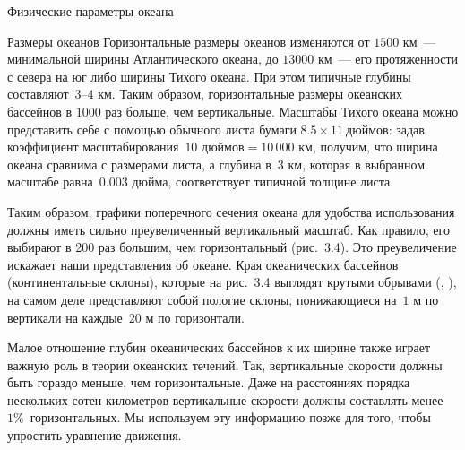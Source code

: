 \begin{chapter}{Физические параметры океана}
\begin{section}{Размеры океанов}
Горизонтальные размеры океанов изменяются от $1500\mbox{~км}$~--- минимальной
ширины Атлантического океана, до $13000\mbox{~км}$~--- его протяженности
с севера на юг либо ширины Тихого океана.
При этом типичные глубины составляют~$3$--$4\mbox{~км}$.
Таким образом, горизонтальные размеры океанских бассейнов в $1000\mbox{~раз}$
больше, чем вертикальные.  Масштабы Тихого океана можно представить
себе с помощью обычного листа бумаги $8.5 \times 11~\mbox{дюймов}$:
задав коэффициент масштабирования~$10\mbox{~дюймов} = 10\,000\mbox{~км}$,
получим, что ширина океана сравнима с размерами листа, а глубина 
в~$3\mbox{~км}$, которая в выбранном масштабе равна~$0.003\mbox{~дюйма}$,
соответствует типичной толщине листа.
%


Таким образом, графики поперечного сечения океана для
удобства использования должны иметь сильно преувеличенный вертикальный
масштаб. Как правило, его выбирают в 200 раз большим, 
чем горизонтальный (рис.~3.4). Это преувеличение искажает наши
представления об океане. Края океанических бассейнов (континентальные
склоны), которые на рис.~3.4 выглядят крутыми обрывами 
(, ), на самом деле представляют собой 
пологие склоны, понижающиеся на~$1\mbox{~м}$ по вертикали 
на каждые~$20\mbox{~м}$ по горизонтали.
%

Малое отношение глубин океанических бассейнов к их ширине также играет 
важную роль в теории океанских течений. Так, вертикальные скорости 
должны быть гораздо меньше, чем горизонтальные. Даже на расстояниях
порядка нескольких сотен километров вертикальные скорости должны составлять 
менее $1\%$~горизонтальных. Мы используем эту информацию позже для того, 
чтобы упростить уравнение движения.
%


\end{section}
\end{chapter}
